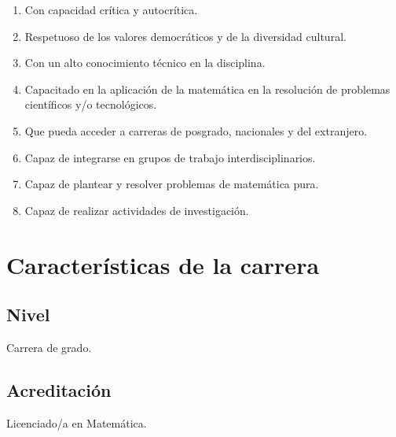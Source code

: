 \documentclass[a4paper, 12pt]{article}
\begin{document}
\begin{enumerate}

 \item Con capacidad crítica y autocrítica. 
 \item Respetuoso de los valores democráticos y de la diversidad cultural.
  \item Con un alto conocimiento técnico en la disciplina.
 \item Capacitado en la aplicación de la matemática en la
resolución de problemas científicos y/o tecnológicos.
\item Que pueda acceder a carreras de posgrado, 
nacionales y del extranjero.
\item Capaz de integrarse en grupos de trabajo interdisciplinarios.
\item Capaz de plantear y resolver problemas de matemática pura.
\item Capaz de realizar actividades de investigación.

\end{enumerate}








\section{Características de la carrera}


\subsection{Nivel} Carrera de grado.

\subsection{Acreditación} Licenciado/a en Matemática.
\end{document}
